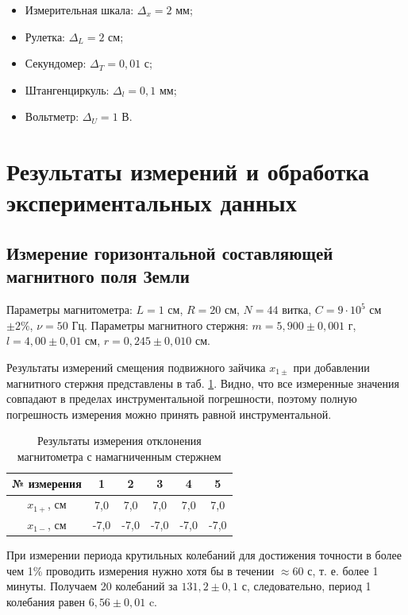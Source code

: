 \documentclass[a4paper,12pt]{article} %
\begin{document}
\begin{itemize}
    \item Измерительная шкала: $\Delta_x = 2$ мм;
    \item Рулетка: $\Delta_L = 2$ см;
    \item Секундомер: $\Delta_T = 0,01$ с;
    \item Штангенциркуль: $\Delta_l = 0,1$ мм;
    \item Вольтметр: $\Delta_U = 1$ В.
\end{itemize}

\section{Результаты измерений и обработка экспериментальных данных}

\subsection{Измерение горизонтальной составляющей магнитного поля Земли}

Параметры магнитометра: $L = 1$ см, $R = 20$ см, $N = 44$ витка, $C = 9\cdot10^5$ см $\pm2\%$, $\nu = 50$ Гц. Параметры магнитного стержня: $m = 5,900\pm0,001$ г, $l = 4,00\pm0,01$ см, $r= 0,245\pm0,010$ см.

Результаты измерений смещения подвижного зайчика $x_{1\pm}$ при добавлении магнитного стержня представлены в таб. \ref{tab:res1}. Видно, что все измеренные значения совпадают в пределах инструментальной погрешности, поэтому полную погрешность измерения можно принять равной инструментальной.

\begin{table}[h!]
\begin{center}
\begin{tabular}{|c|c|c|c|c|c|}
\hline
    № измерения & 1 & 2 & 3 & 4 & 5 \\ \hline
    $x_{1+}$, см & 7,0 & 7,0 & 7,0 & 7,0 & 7,0 \\ \hline
    $x_{1-}$, см & -7,0 & -7,0 & -7,0 & -7,0 & -7,0 \\ \hline
\end{tabular}
\end{center}
\caption{Результаты измерения отклонения магнитометра с намагниченным стержнем}
\label{tab:res1}
\end{table}

При измерении периода крутильных колебаний для достижения точности в более чем 1\% проводить измерения нужно хотя бы в течении $\approx 60$ с, т. е. более 1 минуты. Получаем 20 колебаний за $131,2\pm0,1$ с, следовательно, период 1 колебания равен $6,56\pm0,01$ c.
\end{document}
